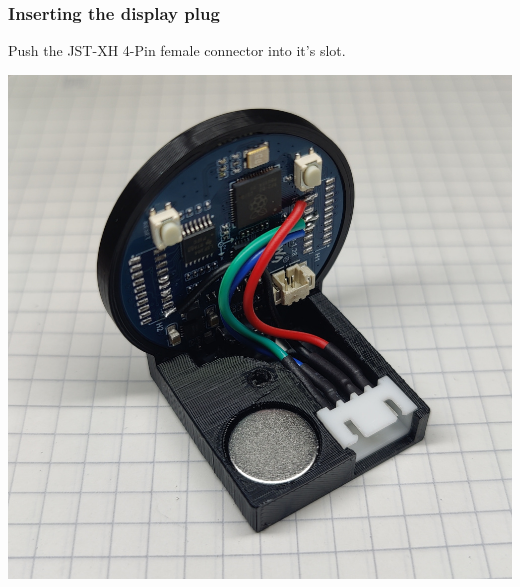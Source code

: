 \documentclass[]{article}
\begin{document}
\subsubsection{Inserting the display plug}
\begin{minipage}[t]{0.5\linewidth}
	\vspace{0pt}
	Push the JST-XH 4-Pin female connector into it's slot.
\end{minipage}
\hfill
\begin{minipage}[t]{0.4\linewidth}
	\vspace{0pt}
	\includegraphics[width=\linewidth]{images/01_displayunit/16_insert_plug.jpg}
\end{minipage}
\end{document}
